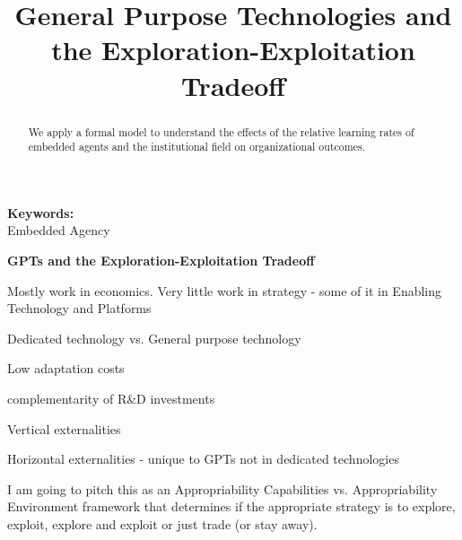 \documentclass[12pt,letterpaper]{article}
\begin{document}
\title{General Purpose Technologies and the Exploration-Exploitation Tradeoff}
\date{}
\maketitle

\begin{abstract} 
\normalsize 
We apply a formal model to understand the effects of the relative learning rates of embedded agents and the institutional field on organizational outcomes. 
\end{abstract}


{\textbf{Keywords:} \\\indent Embedded Agency}

\newpage
\pagestyle{fancy}
\fancyhf{}
\rhead{\thepage}

\begin{center}
\textbf{GPTs and the Exploration-Exploitation Tradeoff}
\end{center}

\cite{Arora2003} \par
\cite{Bresnahan1995} \par
\cite{Gambardella2010} \par
\cite{Maine2006} \par
\cite{Nelson1959} \par
\cite{Thoma2009} \par
\cite{Boudreau2010} \par
\cite{Hosasain2011} \par
\cite{Teece2012a} \par
\cite{Rosenberg2004} \par

Mostly work in economics. Very little work in strategy - some of it in Enabling Technology and Platforms \cite{Teece2012a}

Dedicated technology vs. General purpose technology

Low adaptation costs

complementarity of R\&D investments

Vertical externalities

Horizontal externalities - unique to GPTs not in dedicated technologies

I am going to pitch this as an Appropriability Capabilities vs. Appropriability Environment framework that determines if the appropriate strategy is to explore, exploit, explore and exploit or just trade (or stay away).
\end{document}

